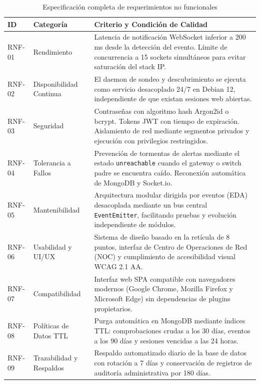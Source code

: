 \documentclass[12pt,a4paper]{report}
\begin{document}
\begin{table}[H]
\centering
\caption{Especificación completa de requerimientos no funcionales}\label{tab:req_no_funcionales}
\small
\begin{tabularx}{\textwidth}{p{1.4cm} p{2.8cm} X}
\toprule
\textbf{ID} & \textbf{Categoría} & \textbf{Criterio y Condición de Calidad} \\
\midrule
RNF-01 & Rendimiento & Latencia de notificación WebSocket inferior a 200 ms desde la detección del evento. Límite de concurrencia a 15 sockets simultáneos para evitar saturación del stack IP. \\
\midrule
RNF-02 & Disponibilidad Continua & El daemon de sondeo y descubrimiento se ejecuta como servicio desacoplado 24/7 en Debian 12, independiente de que existan sesiones web abiertas. \\
\midrule
RNF-03 & Seguridad & Contraseñas con algoritmo hash Argon2id o bcrypt. Tokens JWT con tiempo de expiración. Aislamiento de red mediante segmentos privados y ejecución con privilegios restringidos. \\
\midrule
RNF-04 & Tolerancia a Fallos & Prevención de tormentas de alertas mediante el estado \texttt{unreachable} cuando el gateway o switch padre se encuentra caído. Reconexión automática de MongoDB y Socket.io. \\
\midrule
RNF-05 & Mantenibilidad & Arquitectura modular dirigida por eventos (EDA) desacoplada mediante un bus central \texttt{EventEmitter}, facilitando pruebas y evolución independiente de módulos. \\
\midrule
RNF-06 & Usabilidad y UI/UX & Sistema de diseño basado en la retícula de 8 puntos, interfaz de Centro de Operaciones de Red (NOC) y cumplimiento de accesibilidad visual WCAG 2.1 AA. \\
\midrule
RNF-07 & Compatibilidad & Interfaz web SPA compatible con navegadores modernos (Google Chrome, Mozilla Firefox y Microsoft Edge) sin dependencias de plugins propietarios. \\
\midrule
RNF-08 & Políticas de Datos TTL & Purga automática en MongoDB mediante índices TTL: comprobaciones crudas a los 30 días, eventos a los 90 días y sesiones vencidas a las 24 horas. \\
\midrule
RNF-09 & Trazabilidad y Respaldos & Respaldo automatizado diario de la base de datos con rotación a 7 días y conservación de registros de auditoría administrativa por 180 días. \\
\bottomrule
\end{tabularx}
\end{table}
\end{document}
